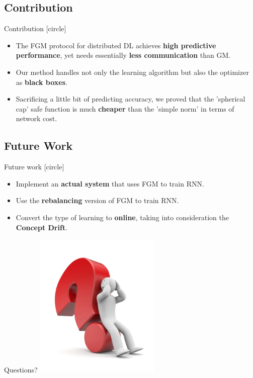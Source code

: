 \subsection{Contribution}\label{subsec:contribution}

\begin{frame}{Contribution}
    [circle]
    \begin{itemize}
        \item{The FGM protocol for distributed DL achieves \textbf{high predictive performance}, yet needs
        essentially \textbf{less communication} than GM.}
        \vspace{1cm}
        \item{Our method handles not only the learning algorithm but also the optimizer as \textbf{black boxes}.}
        \vspace{1cm}
        \item{Sacrificing a little bit of predicting accuracy, we proved that the 'spherical cap' safe function is much \textbf{cheaper} than the 'simple norm' in terms of network cost.}
    \end{itemize}
\end{frame}

\subsection{Future Work}\label{subsec:future-work}

\begin{frame}{Future work}
    [circle]
    \begin{itemize}
        \item{Implement an \textbf{actual system} that uses FGM to train RNN.}
        \vspace{1cm}
        \item{Use the \textbf{rebalancing} version of FGM to train RNN.}
        \vspace{1cm}
        \item{Convert the type of learning to \textbf{online}, taking into consideration the \textbf{Concept Drift}.}
    \end{itemize}
\end{frame}

\begin{frame}{Questions?}
    \centering
    \includegraphics[width=6cm,height=7cm]{images/question-mark.png}
\end{frame}